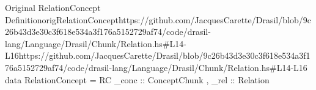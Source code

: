 \begin{haskell}{Original RelationConcept Definition}{origRelationConcept}{https://github.com/JacquesCarette/Drasil/blob/9c26b43d3e30c3f618e534a3f176a5152729a\newline{}f74/code/drasil-lang/Language/Drasil/Chunk/Relation.hs\#L14-L16}{https://github.com/JacquesCarette/Drasil/blob/9c26b43d3e30c3f618e534a3f176a5152729af74/code/drasil-lang/Language/Drasil/Chunk/Relation.hs\#L14-L16}
data RelationConcept = RC { _conc :: ConceptChunk
                           , _rel :: Relation
                           }
\end{haskell}
